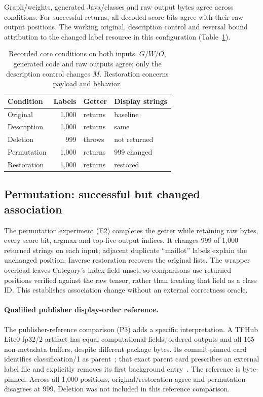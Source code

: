 \documentclass[10pt,conference]{IEEEtran}
\begin{document}
Graph/weights, generated Java/classes and raw output bytes agree across conditions. For successful returns, all decoded score bits agree with their raw output positions. The working original, description control and reversal bound attribution to the changed label resource in this configuration (Table~\ref{tab:core}).

\begin{table}[t]
\caption{Recorded core conditions on both inputs. $G/W/O$, generated code and raw outputs agree; only the description control changes $M$. Restoration concerns payload and behavior.}
\label{tab:core}
\centering\small
\begin{tabular}{@{}lrll@{}}
\toprule
Condition & Labels & Getter & Display strings\\
\midrule
Original & 1,000 & returns & baseline\\
Description & 1,000 & returns & same\\
Deletion & 999 & throws & not returned\\
Permutation & 1,000 & returns & 999 changed\\
Restoration & 1,000 & returns & restored\\
\bottomrule
\end{tabular}
\end{table}

\subsection{Permutation: successful but changed association}
\label{sec:e2}
The permutation experiment (E2) completes the getter while retaining raw bytes, every score bit, argmax and top-five output indices. It changes 999 of 1,000 returned strings on each input; adjacent duplicate ``maillot'' labels explain the unchanged position. Inverse restoration recovers the original lists. The wrapper overload leaves Category's index field unset, so comparisons use returned positions verified against the raw tensor, rather than treating that field as a class ID. This establishes association change without an external correctness oracle.

\paragraph{Qualified publisher display-order reference.}
\label{sec:p3}
The publisher-reference comparison (P3) adds a specific interpretation. A TFHub Lite0 fp32/2 artifact has equal computational fields, ordered outputs and all 165 non-metadata buffers, despite different package bytes. Its commit-pinned card identifies classification/1 as parent~\cite{tfhub-lite-card}; that exact parent card prescribes an external label file and explicitly removes its first background entry~\cite{tfhub-parent-card,imagenet-display}. The reference is byte-pinned. Across all 1,000 positions, original/restoration agree and permutation disagrees at 999. Deletion was not included in this reference comparison.
\end{document}
